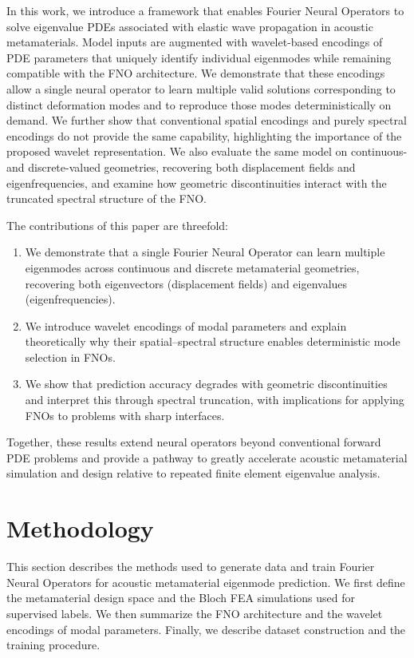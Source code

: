 \documentclass[preprint,review,12pt,numafflabel]{elsarticle}
\begin{document}
In this work, we introduce a framework that enables Fourier Neural Operators to solve eigenvalue PDEs associated with elastic wave propagation in acoustic metamaterials. Model inputs are augmented with wavelet-based encodings of PDE parameters that uniquely identify individual eigenmodes while remaining compatible with the FNO architecture. We demonstrate that these encodings allow a single neural operator to learn multiple valid solutions corresponding to distinct deformation modes and to reproduce those modes deterministically on demand. We further show that conventional spatial encodings and purely spectral encodings do not provide the same capability, highlighting the importance of the proposed wavelet representation. We also evaluate the same model on continuous- and discrete-valued geometries, recovering both displacement fields and eigenfrequencies, and examine how geometric discontinuities interact with the truncated spectral structure of the FNO.

The contributions of this paper are threefold:

\begin{enumerate}
    \item We demonstrate that a single Fourier Neural Operator can learn multiple eigenmodes across continuous and discrete metamaterial geometries, recovering both eigenvectors (displacement fields) and eigenvalues (eigenfrequencies).
    
    \item We introduce wavelet encodings of modal parameters and explain theoretically why their spatial--spectral structure enables deterministic mode selection in FNOs.
    
    \item We show that prediction accuracy degrades with geometric discontinuities and interpret this through spectral truncation, with implications for applying FNOs to problems with sharp interfaces.
\end{enumerate}

Together, these results extend neural operators beyond conventional forward PDE problems and provide a pathway to greatly accelerate acoustic metamaterial simulation and design relative to repeated finite element eigenvalue analysis.

\section{Methodology}
\label{sec:Methodology}
This section describes the methods used to generate data and train Fourier Neural Operators for acoustic metamaterial eigenmode prediction. We first define the metamaterial design space and the Bloch FEA simulations used for supervised labels. We then summarize the FNO architecture and the wavelet encodings of modal parameters. Finally, we describe dataset construction and the training procedure.
\end{document}
